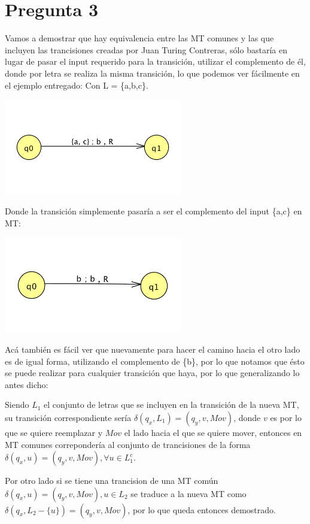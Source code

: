 \documentclass[11pt,letterpaper]{article}
\begin{document}
\section{Pregunta 3}
Vamos a demostrar que hay equivalencia entre las MT comunes y las que incluyen las trancisiones creadas por Juan Turing Contreras, sólo bastaría en lugar de pasar el input requerido para la transición, utilizar el complemento de él, donde por letra se realiza la misma transición, lo que podemos ver fácilmente en el ejemplo entregado:
Con L = \{a,b,c\}.
\begin{center}
\includegraphics[height=4.2cm]{p3a.png}
\end{center}
Donde la transición simplemente pasaría a ser el complemento del input \{a,c\} en MT:
\begin{center}
\includegraphics[height=4.2cm]{p3b.png}
\end{center}
Acá también es fácil ver que nuevamente para hacer el camino hacia el otro lado es de igual forma, utilizando el complemento de \{b\}, por lo que notamos que ésto se puede realizar para cualquier transición que haya, por lo que generalizando lo antes dicho:

Siendo $L_1$ el conjunto de letras que se incluyen en la transición de la nueva MT, su transición correspondiente sería $\delta(q_x, L_1) = (q_y, v, Mov)$, donde $v$ es por lo que se quiere reemplazar y $Mov$ el lado hacia el que se quiere mover, entonces en MT comunes correpondería al conjunto de trancisiones de la forma $\delta(q_x, u) = (q_y, v, Mov), \forall u \in L_1^c$. 

Por otro lado si se tiene una trancision de una MT común $\delta(q_x, u) = (q_y, v, Mov), u \in L_2$ se traduce a la nueva MT como $\delta(q_x, L_2 - \{u\}) = (q_y, v, Mov)$, por lo que queda entonces demostrado.
\end{document}
